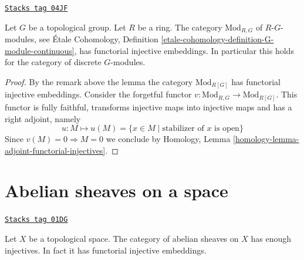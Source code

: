 \begin{lemma}[G modules]
\label{injectives-lemma-G-modules}
\href{https://stacks.math.columbia.edu/tag/04JF}{\texttt{Stacks tag 04JF}}

Let $G$ be a topological group. Let $R$ be a ring.
The category $\text{Mod}_{R, G}$ of $R\text{-}G$-modules, see
\'Etale Cohomology, Definition
\ref{etale-cohomology-definition-G-module-continuous},
has functorial injective embeddings. In particular this holds
for the category of discrete $G$-modules.
\end{lemma}

\begin{proof}
By the remark above the lemma the category $\text{Mod}_{R[G]}$
has functorial injective embeddings.
Consider the forgetful functor
$v : \text{Mod}_{R, G} \to \text{Mod}_{R[G]}$.
This functor is fully faithful, transforms injective maps into
injective maps and has a right adjoint, namely
$$
u : M \mapsto u(M) = \{x \in M \mid \text{stabilizer of }x\text{ is open}\}
$$
Since $v(M) = 0 \Rightarrow M = 0$ we conclude by
Homology, Lemma \ref{homology-lemma-adjoint-functorial-injectives}.
\end{proof}

\section{Abelian sheaves on a space}
\label{injectives-section-abelian-sheaves-space}
\begin{lemma}
\label{injectives-lemma-abelian-sheaves-space}
\href{https://stacks.math.columbia.edu/tag/01DG}{\texttt{Stacks tag 01DG}}

Let $X$ be a topological space.
The category of abelian sheaves on $X$ has enough injectives.
In fact it has functorial injective embeddings.
\end{lemma}

